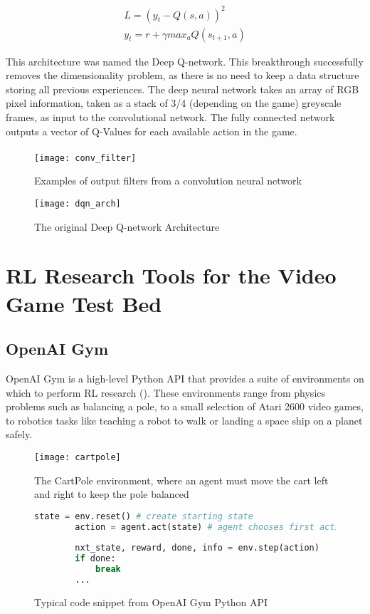 \begin{align}
    L = (y_t - Q(s, a))^2 \label{equ:DQLoss} \\
    y_t = r + \gamma max_{a}Q(s_{t+1}, a) \label{equ:DQTarget}
\end{align}

This architecture was named the Deep Q-network. This breakthrough successfully removes the dimensionality problem, as there is no need to keep a data structure storing all previous experiences. The deep neural network takes an array of RGB pixel information, taken as a stack of 3/4 (depending on the game) greyscale frames, as input to the convolutional network. The fully connected network outputs a vector of Q-Values for each available action in the game. \paragraph{}

\begin{figure}[H]
    \centering
    \texttt{[image: conv\_filter]}
    \caption{Examples of output filters from a convolution neural network}
\end{figure}
\begin{figure}[H]
    \centering
    \texttt{[image: dqn\_arch]}
    \caption{The original Deep Q-network Architecture}
\end{figure}

\section{RL Research Tools for the Video Game Test Bed}
\subsection{OpenAI Gym}
OpenAI Gym is a high-level Python API that provides a suite of environments on which to perform RL research (\cite{openaigym}). These environments range from physics problems such as balancing a pole, to a small selection of Atari 2600 video games, to robotics tasks like teaching a robot to walk or landing a space ship on a planet safely.

\begin{figure}[H]
    \centering
    \texttt{[image: cartpole]}
    \caption{The CartPole environment, where an agent must move the cart left and right to keep the pole balanced}
\end{figure}

\begin{figure}[h]
    \centering
    \begin{lstlisting}[language=Python]
        state = env.reset() # create starting state
        action = agent.act(state) # agent chooses first action
        
        nxt_state, reward, done, info = env.step(action)
        if done:
            break
        ...
    \end{lstlisting}
    \caption{Typical code snippet from OpenAI Gym Python API}
\end{figure}

